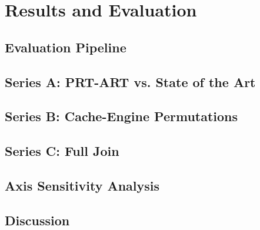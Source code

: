 \chapter{Results and Evaluation}\label{ch:results}

%   
%   

\section{Evaluation Pipeline}\label{sec:eval-pipeline}

\section{Series A: PRT-ART vs. State of the Art}\label{sec:result-a}

\section{Series B: Cache-Engine Permutations}\label{sec:result-b}

\section{Series C: Full Join}\label{sec:result-c}

\section{Axis Sensitivity Analysis}\label{sec:sensitivity}

\section{Discussion}\label{sec:discussion}
